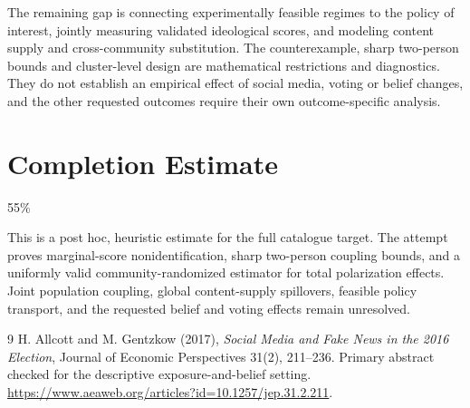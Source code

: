 \documentclass[11pt,a4paper]{article}
\begin{document}
The remaining gap is connecting experimentally feasible regimes to the policy of interest, jointly measuring validated ideological scores, and modeling content supply and cross-community substitution. The counterexample, sharp two-person bounds and cluster-level design are mathematical restrictions and diagnostics. They do not establish an empirical effect of social media, voting or belief changes, and the other requested outcomes require their own outcome-specific analysis.

\section{Completion Estimate}
55\%

This is a post hoc, heuristic estimate for the full catalogue target.
The attempt proves marginal-score nonidentification, sharp two-person coupling bounds, and a uniformly valid community-randomized estimator for total polarization effects. Joint population coupling, global content-supply spillovers, feasible policy transport, and the requested belief and voting effects remain unresolved.

\begin{thebibliography}{9}
 H. Allcott and M. Gentzkow (2017), \emph{Social Media and Fake News in the 2016 Election}, Journal of Economic Perspectives 31(2), 211--236. Primary abstract checked for the descriptive exposure-and-belief setting. \url{https://www.aeaweb.org/articles?id=10.1257/jep.31.2.211}.
\end{thebibliography}
\end{document}
